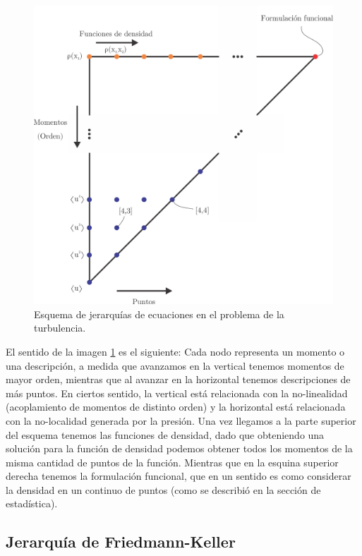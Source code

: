 \documentclass[executivepaper,12pt]{article}
\numberwithin{equation}{section}
\begin{document}
 \begin{figure}[H]
 	\begin{center}
 		\includegraphics[scale=0.87]{jerarquia}
 	\end{center}
 	\caption{Esquema de jerarquías de ecuaciones en el problema de la turbulencia. }
 	\label{fig-jer1}
 \end{figure}

El sentido de la imagen \ref{fig-jer1} es el siguiente: Cada nodo representa un momento o una descripción, a medida que avanzamos en la vertical tenemos momentos de mayor orden, mientras que al avanzar en la horizontal tenemos descripciones de más puntos. En ciertos sentido, la vertical está relacionada con la no-linealidad (acoplamiento de momentos de distinto orden) y la horizontal está relacionada con la no-localidad generada por la presión. Una vez llegamos a la parte superior del esquema tenemos las funciones de densidad, dado que obteniendo una solución para la función de densidad podemos obtener todos los momentos de la misma cantidad de puntos de la función. Mientras que en la esquina superior derecha tenemos la formulación funcional, que en un sentido es como considerar la densidad en un continuo de puntos (como se describió en la sección de estadística). 


\subsection{Jerarquía de Friedmann-Keller}
\end{document}
